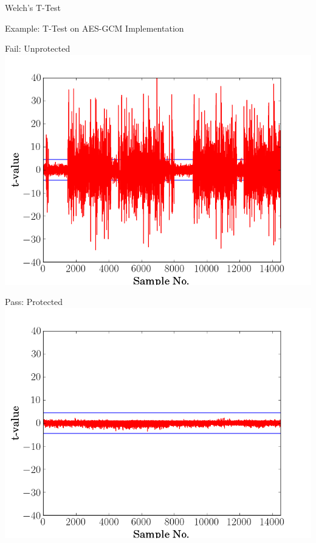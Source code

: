 \documentclass[xcolor=pdftex,dvipsnames,table,final]{beamer}
\begin{document}
\begin{frame}[fragile]{}
\begin{columns}[t]
\begin{column}{.31\linewidth}
\begin{block}{Welch's T-Test}
      \end{block}
      \begin{block}{Example: T-Test on AES-GCM Implementation}
         \begin{minipage}{0.45\linewidth}
             \begin{center}
               Fail: Unprotected
            \includegraphics[scale=0.6]{../figures/aes_gcm_unprotected.png}
        \end{center} 
        \end{minipage}
       \begin{minipage}{0.45\linewidth}

        \begin{center}
             Pass: Protected
            \includegraphics[scale=0.6]{../figures/aes_gcm_protected.png}
            \end{center} 
         

\end{minipage}
\end{block}
\end{column}
\end{columns}
\end{frame}
\end{document}
